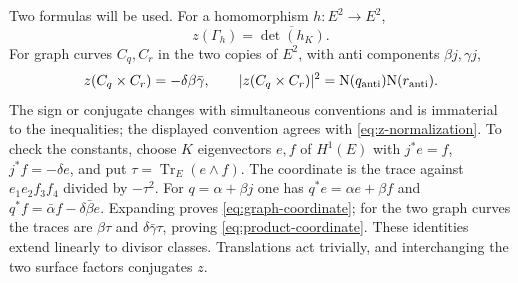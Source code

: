 Two formulas will be used.  For a homomorphism $h:E^2\to E^2$,
\begin{equation}
\label{eq:graph-coordinate}
 z(\Gamma_h)=\overline{\det(h_K)}.
\end{equation}
For graph curves $C_q,C_r$ in the two copies of $E^2$, with anti components $\beta j,\gamma j$,
\begin{equation}
\label{eq:product-coordinate}
 z(C_q\times C_r)=-\delta\beta\bar\gamma,
 \qquad |z(C_q\times C_r)|^2=\mathrm N(q_{\rm anti})\mathrm N(r_{\rm anti}).
\end{equation}
The sign or conjugate changes with simultaneous conventions and is immaterial to the inequalities; the displayed convention agrees with \eqref{eq:z-normalization}.
To check the constants, choose $K$ eigenvectors $e,f$ of $H^1(E)$ with
$j^*e=f$, $j^*f=-\delta e$, and put $\tau=\operatorname{Tr}_E(e\wedge f)$.
The coordinate is the trace against $e_1e_2f_3f_4$ divided by $-\tau^2$.
For $q=\alpha+\beta j$ one has
$q^*e=\alpha e+\beta f$ and $q^*f=\bar\alpha f-\delta\bar\beta e$.
Expanding proves \eqref{eq:graph-coordinate}; for the two graph curves the traces are $\beta\tau$ and $\delta\bar\gamma\tau$, proving \eqref{eq:product-coordinate}.  These identities extend linearly to divisor classes.  Translations act trivially, and interchanging the two surface factors conjugates $z$.

